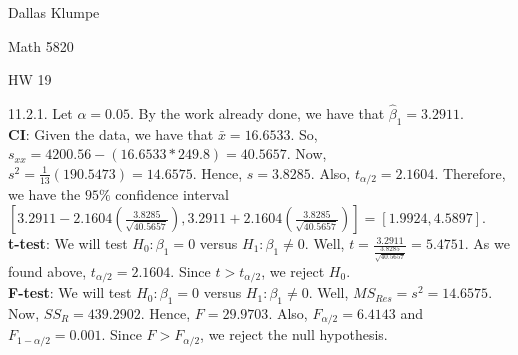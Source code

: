 \documentclass[12pt]{article}
\begin{document}
\noindent Dallas Klumpe

\noindent Math 5820

\noindent HW 19

11.2.1. Let $\alpha=0.05$. By the work already done, we have that $\hat{\beta}_1=3.2911$.\\
\textbf{CI}: Given the data, we have that $\bar{x}=16.6533$. So, $s_{xx}=4200.56-(16.6533*249.8)=40.5657$. Now, $s^2=\frac{1}{13}(190.5473)=14.6575$. Hence, $s=3.8285$. Also, $t_{\alpha/2}=2.1604$. Therefore, we have the $95\%$ confidence interval $[3.2911-2.1604(\frac{3.8285}{\sqrt{40.5657}}), 3.2911+2.1604(\frac{3.8285}{\sqrt{40.5657}})]=[1.9924, 4.5897]$.\\
\textbf{t-test}: We will test $H_0:\beta_1=0$ versus $H_1:\beta_1\neq0$. Well, $t=\frac{3.2911}{\frac{3.8285}{\sqrt{40.5657}}}=5.4751$. As we found above, $t_{\alpha/2}=2.1604$. Since $t>t_{\alpha/2}$, we reject $H_0$.\\
\textbf{F-test}: We will test $H_0:\beta_1=0$ versus $H_1:\beta_1\neq0$. Well, $MS_{Res}=s^2=14.6575$. Now, $SS_R=439.2902$. Hence, $F=29.9703$. Also, $F_{\alpha/2}=6.4143$ and $F_{1-\alpha/2}=0.001$. Since $F>F_{\alpha/2}$, we reject the null hypothesis.
\end{document}
